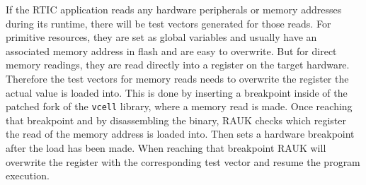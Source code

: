 %
%
%
%
%

If the RTIC application reads any hardware peripherals or memory addresses
during its runtime, there will be test vectors generated for those reads. For
primitive resources, they are set as global variables and usually have an
associated memory address in flash and are easy to overwrite. But for direct
memory readings, they are read directly into a register on the target hardware.
Therefore the test vectors for memory reads needs to overwrite the register
the actual value is loaded into. This is done by inserting a breakpoint inside
of the patched fork of the \texttt{vcell} library, where a memory read is made.
Once reaching that breakpoint and by disassembling the binary, RAUK checks
which register the read of the memory address is loaded into. Then sets a
hardware breakpoint after the load has been made. When reaching that breakpoint
RAUK will overwrite the register with the corresponding test vector and resume
the program execution.


